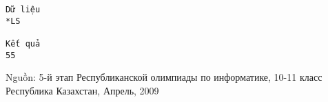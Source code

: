 \begin{verbatim}
Dữ liệu
*LS		

Kết quả
55
\end{verbatim}

   Nguồn: 5-й этап Республиканской олимпиады по информатике, 10-11 класс Республика Казахстан, Апрель, 2009